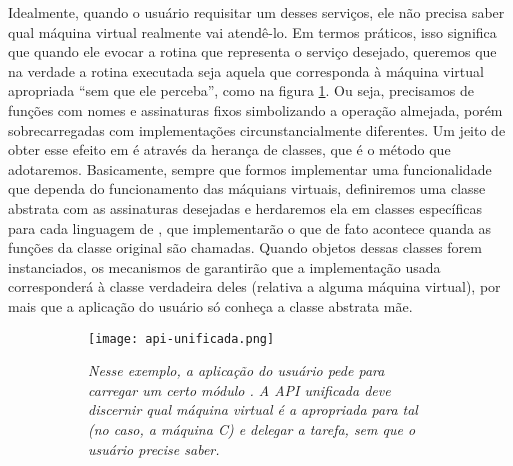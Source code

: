     Idealmente, quando o usuário requisitar um desses serviços, ele não precisa
    saber qual máquina virtual realmente vai atendê-lo. Em termos práticos, isso
    significa que quando ele evocar a rotina que representa o serviço desejado,
    queremos que na verdade a rotina executada seja aquela que corresponda à
    máquina virtual apropriada ``sem que ele perceba'', como na figura
    \ref{fig:api-unificada}. Ou seja, precisamos de funções com nomes e
    assinaturas\footnotemark{} fixos simbolizando a operação almejada, porém
    sobrecarregadas com implementações circunstancialmente diferentes. Um jeito
    de obter esse efeito em \CXX{} é através da herança de classes, que é o
    método que adotaremos. Basicamente, sempre que formos implementar uma
    funcionalidade que dependa do funcionamento das máquians virtuais,
    definiremos uma classe abstrata com as assinaturas desejadas e herdaremos
    ela em classes específicas para cada linguagem de \script{}, que
    implementarão o que de fato acontece quanda as funções da classe original
    são chamadas. Quando objetos dessas classes forem instanciados, os
    mecanismos de \CXX{} garantirão que a implementação usada corresponderá à
    classe verdadeira deles (relativa a alguma máquina virtual), por mais que a
    aplicação do usuário só conheça a classe abstrata mãe.


    \begin{figure}[ht]
      \centering
      \caption{}
      \begin{subfigure}{.8\textwidth}
        \begin{center}
          \texttt{[image: api-unificada.png]}
          \vspace{1em}
        \end{center}
        \textit{
          Nesse exemplo, a aplicação do usuário pede para carregar um certo
          módulo \script{}. A API unificada deve discernir qual máquina virtual
          é a apropriada para tal (no caso, a máquina C) e delegar a tarefa, sem
          que o usuário precise saber.
        }
      \end{subfigure}
      \label{fig:api-unificada}
    \end{figure}

